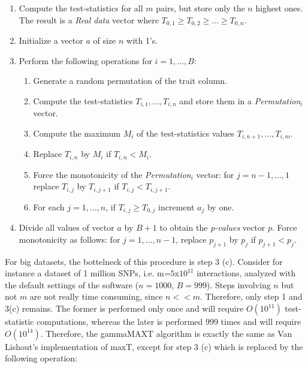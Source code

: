 \documentclass{bmcart}
\begin{document}
\begin{enumerate}
\item Compute the test-statistics for all $m$ pairs, but store only the $n$ highest ones. The result is a {\em Real data} vector where $T_{0,1} \ge T_{0,2} \ge \ldots \ge T_{0,n}$.
\item Initialize a vector $a$ of size $n$ with 1's.
\item Perform the following operations for $i=1,\ldots,B$: 
\begin{enumerate}
\item Generate a random permutation of the trait column. 
\item Compute the test-statistics $T_{i,1}, \ldots, T_{i,n}$ and store them in a {\em Permutation$_i$} vector.
\item Compute the maximum $M_i$ of the test-statistics values $T_{i,n+1}, \ldots, T_{i,m}$.
\item Replace $T_{i,n}$ by $M_i$ if $T_{i,n} < M_i$.
\item Force the monotonicity of the {\em Permutation$_i$} vector: for $j = n-1,\ldots,1$ replace $T_{i,j}$ by $T_{i,j+1}$ if $T_{i,j} < T_{i,j+1}$. 
\item For each $j = 1, \ldots, n$, if $T_{i,j} \ge T_{0,j}$ increment $a_j$ by one.
\end{enumerate}
\item Divide all values of vector $a$ by $B+1$ to obtain the {\em p-values} vector $p$. Force monotonicity as follows: for $j = 1,\ldots,n-1$, replace $p_{j+1}$ by $p_{j}$ if $p_{j+1} < p_j$.
\end{enumerate}

\medskip

For big datasets, the bottelneck of this procedure is step 3 (c). Consider for instance a dataset of 1 million SNPs, i.e. m=$5$x$10^{11}$ interactions, analyzed with the default settings of the software ($n=1000$, $B=999$). Steps involving $n$ but not $m$ are not really time consuming, since $n << m$. Therefore, only step 1 and 3(c) remains. The former is performed only once and will require $O(10^{11})$ test-statistic computations, whereas the later is performed 999 times and will require $O(10^{14})$. Therefore, the gammaMAXT algorithm is exactly the same as Van Lishout's implementation of maxT, except for step 3 (c) which is replaced by the following operation:
\end{document}
